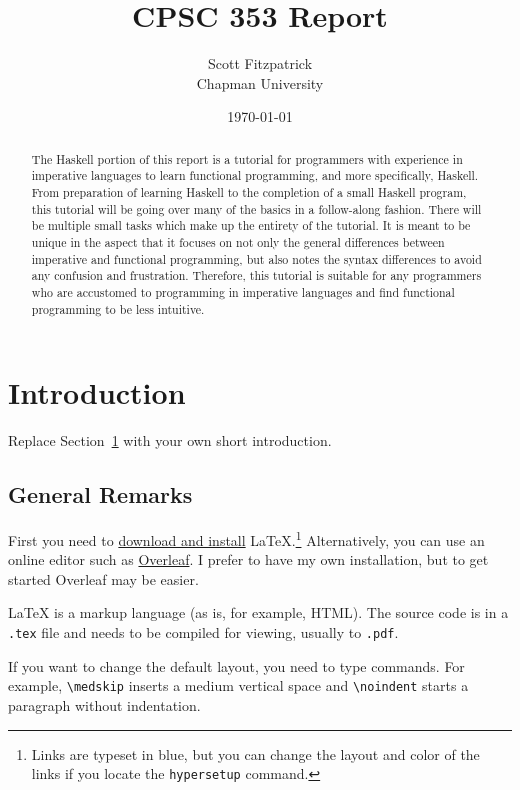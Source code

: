 \documentclass{article}
\title{CPSC 353 Report}
\author{Scott Fitzpatrick  \\ Chapman University}
\date{\today}
\begin{document}
\maketitle

\begin{abstract}
The Haskell portion of this report is a tutorial for programmers with experience in imperative languages to learn functional programming, and more specifically, Haskell. From preparation of learning Haskell to the completion of a small Haskell program, this tutorial will be going over many of the basics in a follow-along fashion. There will be multiple small tasks which make up the entirety of the tutorial. It is meant to be unique in the aspect that it focuses on not only the general differences between imperative and functional programming, but also notes the syntax differences to avoid any confusion and frustration. Therefore, this tutorial is suitable for any programmers who are accustomed to programming in imperative languages and find functional programming to be less intuitive.
\end{abstract}

\tableofcontents

\section{Introduction}\label{intro}

Replace Section~\ref{intro} with your own short introduction. 

\subsection{General Remarks}

First you need to \href{https://www.latex-project.org/get/}{download and install} LaTeX.\footnote{Links are typeset in blue, but you can change the layout and color of the links if you locate the  \texttt{hypersetup} command.}
%
Alternatively, you can use an online editor such as \href{https://www.overleaf.com/learn}{Overleaf}. I prefer to have my own installation, but to get started Overleaf may be easier. 

 
\medskip\noindent
LaTeX is a markup language (as is, for example, HTML). The source code is in a \verb+.tex+ file and needs to be compiled for viewing, usually to \verb+.pdf+.


\medskip\noindent
If you want to change the default layout, you need to type commands. For example, \verb+\medskip+ inserts a medium vertical space and \verb+\noindent+ starts a paragraph without indentation.
 
\end{document}
